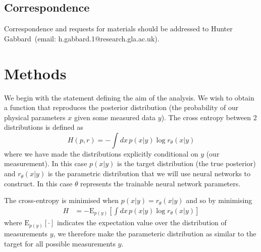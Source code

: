 \documentclass[%
showpacs,
 amsmath,amssymb,
 aps,
 twocolumn,
 prl,
 reprint,
floatfix,
]{revtex4-1}
\begin{document}
 \subsection{Correspondence} Correspondence and requests for materials should be addressed to Hunter Gabbard~(email: h.gabbard.1@research.gla.ac.uk).

%
%
\section{Methods}\label{sec:methods}
%

%
%
We begin with the statement defining the aim of the analysis. We wish to obtain
a function that reproduces the posterior distribution (the probability of our
physical parameters $x$ given some measured data $y$). The cross entropy
between 2 distributions is defined as
%
\begin{equation}\label{eq:cross_ent}
H(p,r) = -\int dx\, p(x|y) \log r_{\theta}(x|y)
\end{equation}
%
where we have made the distributions explicitly conditional on $y$ (our
measurement). In this case $p(x|y)$ is the target distribution (the true
posterior) and $r_{\theta}(x|y)$ is the parametric distribution that we will
use neural networks to construct. In this case $\theta$ represents the
trainable neural network parameters. 

The cross-entropy is minimised when $p(x|y)=r_{\theta}(x|y)$ and so by
minimising
%
\begin{align}\label{eq:cost1}
H &= -\text{E}_{p(y)}\left[\int dx\,p(x|y) \log r_{\theta}(x|y)\right]
\end{align}
% 
where $\text{E}_{p(y)}[\cdot]$ indicates the expectation value over the
distribution of measurements $y$, we therefore make the parameteric distribution
as similar to the target for all possible measurements $y$.
\end{document}
